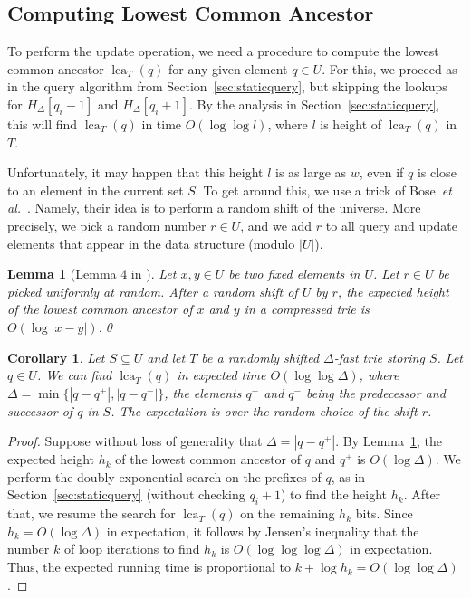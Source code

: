 \documentclass[a4paper,11pt]{article}
\newtheorem{lemma}[theorem]{Lemma}
\newtheorem{corollary}[theorem]{Corollary}
\newcommand{\etal}{\emph{et al.}\xspace}
\newcommand{\?}{\mskip1.5mu}
\DeclareMathOperator{\lca}{lca} %
\begin{document}
\subsection{Computing Lowest Common Ancestor}

To perform the update operation, we need a
procedure to compute the lowest common ancestor 
$\lca_T(q)$ for any given element $q \in U$. 
For this, we proceed as in the query algorithm from 
Section~\ref{sec:staticquery}, but skipping 
the lookups for $H_\Delta[q_i-1]$ and
$H_\Delta[q_i+1]$. By the analysis in 
Section~\ref{sec:staticquery}, this will find 
$\lca_T(q)$ in time $O(\log \log l)$, where $l$
is height of $\lca_T(q)$ in $T$.

Unfortunately, it may happen that this height $l$ is as large as $w$,
even if $q$ is close to an element in the current set $S$.
To get around this, we use a trick of Bose~\etal~\cite{BoseDoDuHoMo13}.
Namely, their idea is to perform a random shift of the universe. 
More precisely, we pick a random number $r \in U$, and we
add $r$ to all query and update elements that appear in 
the data structure (modulo $|U|$).

\begin{lemma}[Lemma 4 in \cite{BoseDoDuHoMo13}]
\label{lemma:delta_lca_loglog_delta}
Let $x, y \in U$ be two fixed elements in $U$.
Let $r \in U$ be picked uniformly at random.
After a random shift of $U$ by $r$, the 
expected height of the lowest common ancestor of 
$x$ and $y$ in a compressed trie is $O(\log|x-y|)$.\qed
\end{lemma}

\begin{corollary}
\label{cor:delta_fast_expected_lca}
Let $S \subseteq U$ and let $T$ be a randomly
shifted $\Delta$-fast trie storing $S$.
Let $q \in U$. 
We can find $\lca_T(q)$ in expected time $O(\log\log \Delta)$,
where $\Delta = \min\{|q - q^+|, |q-q^-|\}$, the elements 
$q^+$ and $q^-$ being the predecessor and successor of $q$ in $S$.
The expectation is
over the random choice of the shift $r$. 
\end{corollary}

\begin{proof}
Suppose without loss of generality that $\Delta = |q - q^+|$.
By Lemma~\ref{lemma:delta_lca_loglog_delta},
the expected height $h_k$ of the lowest common ancestor of $q$ and $q^+$
is $O(\log \Delta)$.
We perform the doubly exponential
search on the prefixes of $q$, as in Section~\ref{sec:staticquery} 
(without checking $q_i+1$) to find the height $h_k$. After
that, we  resume the search for $\lca_T(q)$ on the 
remaining $h_k$ bits. Since $h_k = O(\log \Delta)$ in expectation,
it follows by Jensen's inequality that the number $k$
of loop iterations to find  $h_k$ is $O(\log\log\log \Delta)$
in expectation. Thus, the expected running time is proportional to
$k + \log h_k = O(\log\log\Delta)$. 
\end{proof}
\end{document}
